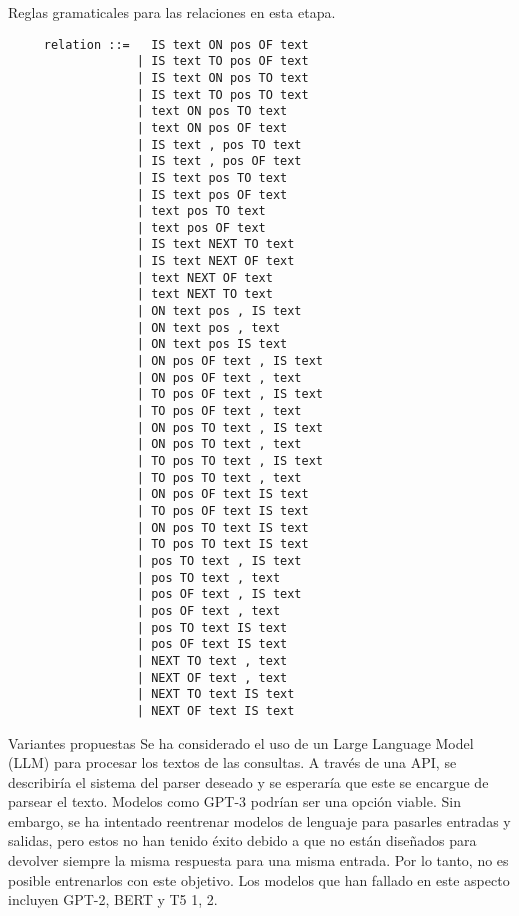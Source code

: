 Reglas gramaticales para las relaciones en esta etapa.
\begin{lstlisting}
     relation ::=   IS text ON pos OF text
                  | IS text TO pos OF text
                  | IS text ON pos TO text
                  | IS text TO pos TO text
                  | text ON pos TO text
                  | text ON pos OF text
                  | IS text , pos TO text
                  | IS text , pos OF text
                  | IS text pos TO text
                  | IS text pos OF text
                  | text pos TO text
                  | text pos OF text
                  | IS text NEXT TO text
                  | IS text NEXT OF text
                  | text NEXT OF text
                  | text NEXT TO text
                  | ON text pos , IS text
                  | ON text pos , text
                  | ON text pos IS text
                  | ON pos OF text , IS text
                  | ON pos OF text , text
                  | TO pos OF text , IS text
                  | TO pos OF text , text
                  | ON pos TO text , IS text
                  | ON pos TO text , text
                  | TO pos TO text , IS text
                  | TO pos TO text , text
                  | ON pos OF text IS text
                  | TO pos OF text IS text
                  | ON pos TO text IS text
                  | TO pos TO text IS text
                  | pos TO text , IS text
                  | pos TO text , text
                  | pos OF text , IS text
                  | pos OF text , text
                  | pos TO text IS text
                  | pos OF text IS text
                  | NEXT TO text , text
                  | NEXT OF text , text
                  | NEXT TO text IS text
                  | NEXT OF text IS text
\end{lstlisting}
 Variantes propuestas
Se ha considerado el uso de un Large Language Model (LLM) para procesar los textos de las consultas. A través de una API, se describiría el sistema del parser deseado y se esperaría que este se encargue de parsear el texto. Modelos como GPT-3 podrían ser una opción viable. Sin embargo, se ha intentado reentrenar modelos de lenguaje para pasarles entradas y salidas, pero estos no han tenido éxito debido a que no están diseñados para devolver siempre la misma respuesta para una misma entrada. Por lo tanto, no es posible entrenarlos con este objetivo. Los modelos que han fallado en este aspecto incluyen GPT-2, BERT y T5 1, 2.


